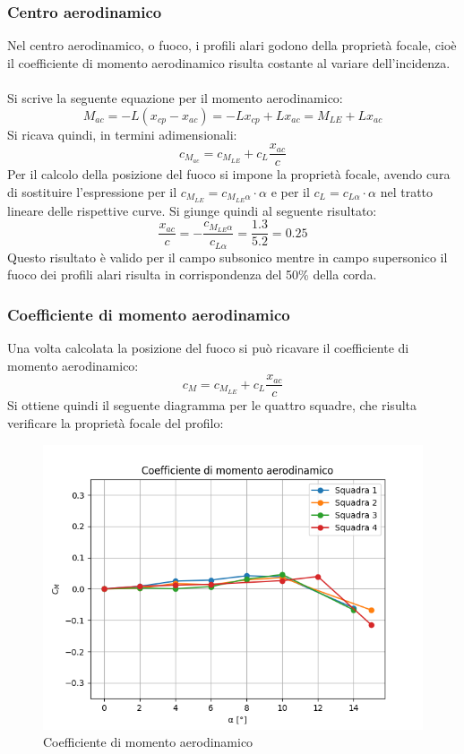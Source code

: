 \subsubsection{Centro aerodinamico}
Nel centro aerodinamico, o fuoco, i profili alari godono della proprietà focale, cioè il coefficiente di momento aerodinamico risulta costante al variare dell'incidenza.\\\\
Si scrive la seguente equazione per il momento aerodinamico:
\begin{equation*}
    M_{ac} = -L(x_{cp} - x_{ac}) = -Lx_{cp} + Lx_{ac} = M_{LE} + Lx_{ac}
\end{equation*}
Si ricava quindi, in termini adimensionali:
\begin{equation*}
    c_{M_{ac}} = c_{M_{LE}} + c_L \frac{x_{ac}}c
\end{equation*}
Per il calcolo della posizione del fuoco si impone la proprietà focale, avendo cura di sostituire l'espressione per il $c_{M_{LE}}=c_{M_{LE}\alpha}\cdot\alpha$ e per il $c_L=c_{L\alpha}\cdot\alpha$ nel tratto lineare delle rispettive curve. Si giunge quindi al seguente risultato:
\begin{equation*}
    \frac{x_{ac}}c = - \frac{c_{M_{LE}\alpha}}{c_{L\alpha}} = \frac{1.3}{5.2} = 0.25
\end{equation*}
Questo risultato è valido per il campo subsonico mentre in campo supersonico il fuoco dei profili alari risulta in corrispondenza del 50\% della corda.

\subsubsection{Coefficiente di momento aerodinamico}
Una volta calcolata la posizione del fuoco si può ricavare il coefficiente di momento aerodinamico:
\begin{equation*}
    c_M = c_{M_{LE}} + c_L \frac{x_{ac}}c
\end{equation*}
Si ottiene quindi il seguente diagramma per le quattro squadre, che risulta verificare la proprietà focale del profilo:
\begin{figure}[H]
    \centering
    \includegraphics[width=.65\textwidth]{images/5/cm.png}
    \caption {Coefficiente di momento aerodinamico}
\end{figure}